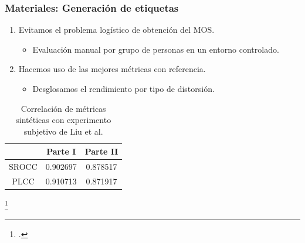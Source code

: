 \begin{frame}
  \frametitle{Materiales: Generación de etiquetas}
  \begin{enumerate}
    \item Evitamos el problema logístico de obtención del MOS.
      \begin{itemize}
        \item Evaluación manual por grupo de personas en un entorno controlado.
      \end{itemize}
    \item Hacemos uso de las mejores métricas con referencia.
      \begin{itemize}
        \item Desglosamos el rendimiento por tipo de distorsión.
      \end{itemize}
  \end{enumerate}
\begin{table}
  \centering 
  \scriptsize
  \begin{tabular}{|c|c|c|}
    \hline
    \rowcolor[HTML]{FFC702}
     & \textbf{Parte I} & \textbf{Parte II} \\
    \hline 
    SROCC & 0.902697 & 0.878517\\
    \hline
    PLCC & 0.910713 & 0.871917\\
    \hline
  \end{tabular}
  \caption[Correlación de métricas sintéticas.]{
    Correlación de métricas sintéticas con experimento subjetivo de Liu et al\footnotemark[9].
}
  \label{tab:PseudoCorr}
\end{table}
\footcitetext{ResSCNN}
\end{frame}

